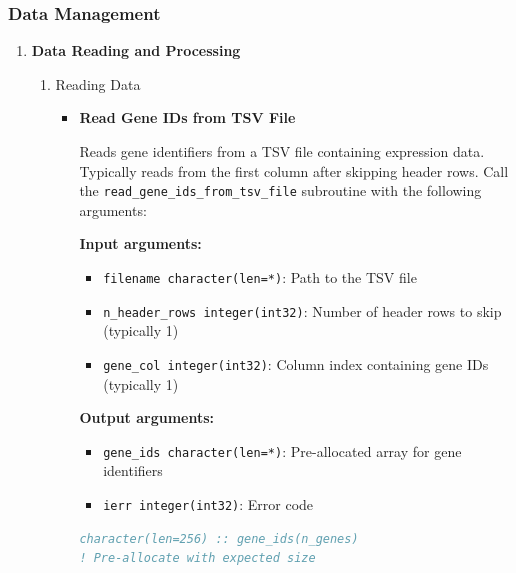 \documentclass[11pt]{article}
\begin{document}
\subsubsection{Data Management}
\begin{enumerate}
	\item \textbf{Data Reading and Processing} \\
	      \begin{enumerate}
	      	\item Reading Data
	      	      \begin{itemize}
	      	      	\item \textbf{Read Gene IDs from TSV File}
	      	      	      
	      	      	      Reads gene identifiers from a TSV file containing expression data.
	      	      	      Typically reads from the first column after skipping header rows. Call
	      	      	      the \texttt{read\_gene\_ids\_from\_tsv\_file} subroutine with the
	      	      	      following arguments:
	      	      	      
	      	      	      \textbf{Input arguments:}
	      	      	      \begin{itemize}
	      	      	      	\item \texttt{filename character(len=*)}: Path to the TSV file
	      	      	      	      
	      	      	      	\item \texttt{n\_header\_rows integer(int32)}: Number of header rows
	      	      	      	      to skip (typically 1)
	      	      	      	      
	      	      	      	\item \texttt{gene\_col integer(int32)}: Column index containing
	      	      	      	      gene IDs (typically 1)
	      	      	      \end{itemize}
	      	      	      \textbf{Output arguments:}
	      	      	      \begin{itemize}
	      	      	      	\item \texttt{gene\_ids character(len=*)}: Pre-allocated array for
	      	      	      	      gene identifiers
	      	      	      	      
	      	      	      	\item \texttt{ierr integer(int32)}: Error code
	      	      	      \end{itemize}
	      	      	      \begin{lstlisting}[language=Fortran, caption={Read Gene IDs from TSV File}]
character(len=256) :: gene_ids(n_genes)  
! Pre-allocate with expected size


\end{lstlisting}
\end{itemize}
\end{enumerate}
\end{enumerate}
\end{document}
